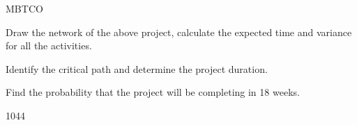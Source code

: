 \documentclass{rvcepaper}
\begin{document}
\begin{iempaper}
\begin{cietable}{M}{BT}{CO}
{
\begin{rom}\item Draw the network of the above project, calculate the expected time and variance for all the activities.\item Identify the critical path and determine the project duration.\item Find the probability that the project will be completing in 18 weeks.\end{rom}}{10}{4}{4}
\end{cietable}
\end{iempaper}
\end{document}
